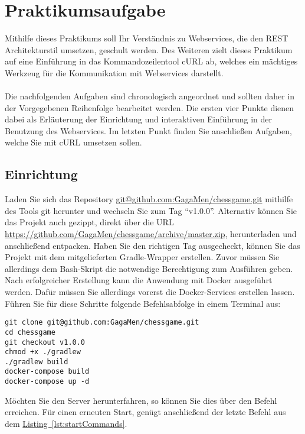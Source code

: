 \chapter{Praktikumsaufgabe}\label{chap:Appendix:A}
Mithilfe dieses Praktikums soll Ihr Verständnis zu Webservices, die den REST Architekturstil umsetzen, geschult werden. Des Weiteren zielt dieses Praktikum auf eine Einführung in das Kommandozeilentool cURL ab, welches ein mächtiges Werkzeug für die Kommunikation mit Webservices darstellt.\\
\\
Die nachfolgenden Aufgaben sind chronologisch angeordnet und sollten daher in der Vorgegebenen Reihenfolge bearbeitet werden. Die ersten vier Punkte dienen dabei als Erläuterung der Einrichtung und interaktiven Einführung in der Benutzung des Webservices. Im letzten Punkt finden Sie anschließen Aufgaben, welche Sie mit cURL umsetzen sollen.

\section{Einrichtung}
Laden Sie sich das Repository \url{git@github.com:GagaMen/chessgame.git} mithilfe des Tools git herunter und wechseln Sie zum Tag \enquote{v1.0.0}. Alternativ können Sie das Projekt auch gezippt, direkt über die \gls{URL} \url{https://github.com/GagaMen/chessgame/archive/master.zip}, herunterladen und anschließend entpacken. Haben Sie den richtigen Tag ausgecheckt, können Sie das Projekt mit dem mitgelieferten Gradle-Wrapper erstellen. Zuvor müssen Sie allerdings dem Bash-Skript die notwendige Berechtigung zum Ausführen geben. Nach erfolgreicher Erstellung kann die Anwendung mit Docker ausgeführt werden. Dafür müssen Sie allerdings vorerst die Docker-Services erstellen lassen. Führen Sie für diese Schritte folgende Befehlsabfolge in einem Terminal aus:\\
\begin{lstlisting}[style=lstStyleFramed, caption={Befehlsabfolge zur Einrichtung des Webservices}, label=lst:startCommands]
git clone git@github.com:GagaMen/chessgame.git
cd chessgame
git checkout v1.0.0
chmod +x ./gradlew
./gradlew build
docker-compose build
docker-compose up -d
\end{lstlisting}
Möchten Sie den Server herunterfahren, so können Sie dies über den Befehl  erreichen. Für einen erneuten Start, genügt anschließend der letzte Befehl aus dem \hyperref[lst:startCommands]{Listing~\ref{lst:startCommands}}.

